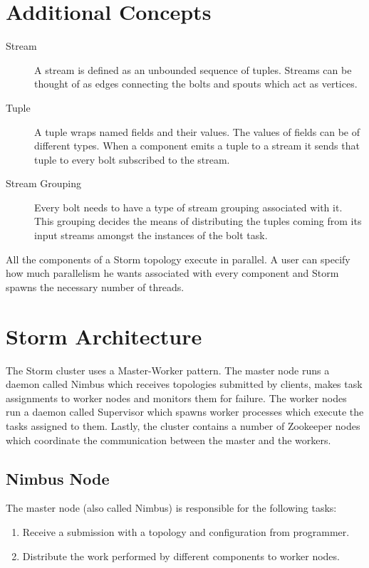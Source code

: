 \documentclass[bsc,logo,frontabs,twoside,singlespacing,normalheadings,parskip]{infthesis}     %
\begin{document}
\section{Additional Concepts}

\begin{description}
  \item[Stream] A stream is defined as an unbounded sequence of tuples. Streams can be thought of as edges connecting the bolts and spouts which act as vertices.
  \item[Tuple] A tuple wraps named fields and their values. The values of fields can be of different types. When a component emits a tuple to a stream it sends that tuple to every bolt subscribed to the stream.
  \item[Stream Grouping] Every bolt needs to have a type of stream grouping associated with it. This grouping decides the means of distributing the tuples coming from its input streams amongst the instances of the bolt task.
\end{description}

All the components of a Storm topology execute in parallel. A user can specify how much parallelism he wants associated with every component and Storm spawns the necessary number of threads.

\section{Storm Architecture}


The Storm cluster uses a Master-Worker pattern. The master node runs a daemon called Nimbus which receives topologies submitted by clients, makes task assignments to worker nodes and monitors them for failure. The worker nodes run a daemon called Supervisor which spawns worker processes which execute the tasks assigned to them. Lastly, the cluster contains a number of Zookeeper nodes which coordinate the communication between the master and the workers.

\subsection{Nimbus Node}

The master node (also called Nimbus) is responsible for the following tasks:

\begin{enumerate}
	\item Receive a submission with a topology and configuration from programmer.
	\item Distribute the work performed by different components to worker nodes.
\end{enumerate}
\end{document}
